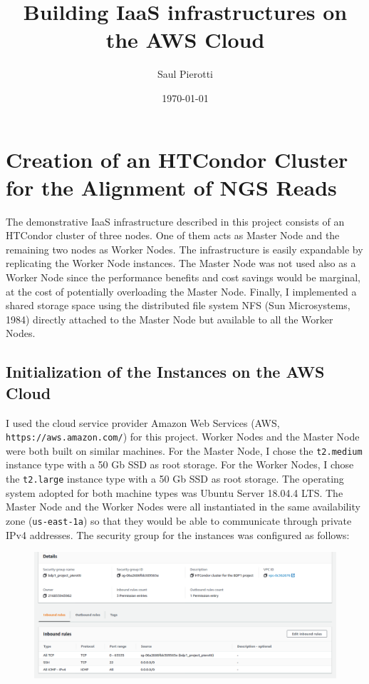 \documentclass{article}
\begin{document}
\title{Building IaaS infrastructures on the AWS Cloud}
\author{Saul Pierotti}
\date{\today}

\maketitle

\section{Creation of an HTCondor Cluster for the Alignment of NGS Reads}
The demonstrative IaaS infrastructure described in this project consists of an HTCondor cluster of three nodes.
One of them acts as Master Node and the remaining two nodes as Worker Nodes.
The infrastructure is easily expandable by replicating the Worker Node instances.
The Master Node was not used also as a Worker Node since the performance benefits and cost savings would be marginal, at the cost of potentially overloading the Master Node.
Finally, I implemented a shared storage space using the distributed file system NFS (Sun Microsystems, 1984) directly attached to the Master Node but available to all the Worker Nodes.

\subsection{Initialization of the Instances on the AWS Cloud}
I used the cloud service provider Amazon Web Services (AWS, \texttt{https://aws.amazon.com/}) for this project.
Worker Nodes and the Master Node were both built on similar machines.
For the Master Node, I chose the \texttt{t2.medium} instance type with a 50 Gb SSD as root storage.
For the Worker Nodes, I chose the \texttt{t2.large} instance type with a 50 Gb SSD as root storage.
The operating system adopted for both machine types was Ubuntu Server 18.04.4 LTS.
The Master Node and the Worker Nodes were all instantiated in the same availability zone (\texttt{us-east-1a}) so that they would be able to communicate through private IPv4 addresses.
The security group for the instances was configured as follows:

\begin{figure}[!h]
    \center
    \includegraphics[width=\textwidth]{./images/security-group.png}
\end{figure}
\end{document}
